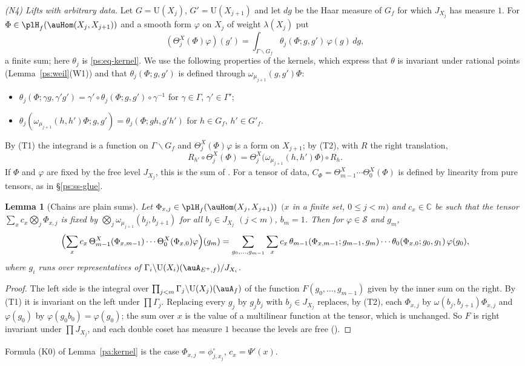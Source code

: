 \documentclass[10pt]{amsart}
\newtheorem{lemma}[theorem]{Lemma}
\theoremstyle{definition}
\theoremstyle{remark}
\newcommand{\C}{\mathbb C}
\providecommand{\auS}{\mathcal S}
\providecommand{\auU}{\mathrm U}
\begin{document}
\emph{{\rm(N4)} Lifts with arbitrary data.} Let $G=\auU(X_j)$, $G'=\auU(X_{j+1})$ and let $dg$ be
the Haar measure of $G_f$ for which $J_{X_j}$ has measure $1$. For $\Phi\in\plH_f(\auHom(X_j,
X_{j+1}))$ and a smooth form $\varphi$ on $X_j$ of weight $\lambda(X_j)$ put
\[
(\Theta^X_j(\Phi)\varphi)(g')=\int_{\Gamma\backslash G_f}\theta_j(\Phi;g,g')\,\varphi(g)\,dg ,
\]
a finite sum; here $\theta_j$ is \eqref{ps:eq-kernel}. We use the following properties of the
kernels, which express that $\theta$ is invariant under rational points (Lemma~\ref{ps:weil}(W1))
and that $\theta_j(\Phi;g,g')$ is defined through $\omega_{\mu_{j+1}}(g,g')\Phi$:
\begin{itemize}
\item[(T1)] $\theta_j(\Phi;\gamma g,\gamma'g')=\gamma'\circ\theta_j(\Phi;g,g')\circ\gamma^{-1}$ for
$\gamma\in\Gamma$, $\gamma'\in\Gamma'$;
\item[(T2)] $\theta_j(\omega_{\mu_{j+1}}(h,h')\Phi;g,g')=\theta_j(\Phi;gh,g'h')$ for $h\in G_f$,
$h'\in G'_f$.
\end{itemize}
By (T1) the integrand is a function on $\Gamma\backslash G_f$ and $\Theta^X_j(\Phi)\varphi$ is a
form on $X_{j+1}$; by (T2), with $R$ the right translation,
\begin{equation}\label{pl:eq-equiv}
R_{h'}\circ\Theta^X_j(\Phi)=\Theta^X_j\bigl(\omega_{\mu_{j+1}}(h,h')\Phi\bigr)\circ R_h .
\end{equation}
If $\Phi$ and $\varphi$ are fixed by the free level $J_{X_j}$, this is the sum of
{\cite[\S14.8]{P46}}. For a tensor of data, $C_\Phi=\Theta^X_{m-1}\cdots\Theta^X_0(\Phi)$ is defined
by linearity from pure tensors, as in \S\ref{ps:ss-glue}.

\begin{lemma}[Chains are plain sums]\label{pl:sum}
Let $\Phi_{x,j}\in\plH_f(\auHom(X_j,X_{j+1}))$ $(x$ in a finite set, $0\le j<m)$ and $c_x\in\C$ be
such that the tensor $\sum_xc_x\bigotimes_j\Phi_{x,j}$ is fixed by $\bigotimes_j\omega_{\mu_{j+1}}
(b_j,b_{j+1})$ for all $b_j\in J_{X_j}$ $(j<m)$, $b_m=1$. Then for $\varphi\in\auS$ and $g_m$,
\[
\Bigl(\sum_xc_x\,\Theta^X_{m-1}(\Phi_{x,m-1})\cdots\Theta^X_0(\Phi_{x,0})\varphi\Bigr)(g_m)=
\sum_{g_0,\dots,g_{m-1}}\sum_xc_x\,\theta_{m-1}(\Phi_{x,m-1};g_{m-1},g_m)\cdots\theta_0(\Phi_{x,0};
g_0,g_1)\,\varphi(g_0),
\]
where $g_i$ runs over representatives of $\Gamma_i\backslash\auU(X_i)(\auA_{E^+,f})/J_{X_i}$.
\end{lemma}
\begin{proof}
The left side is the integral over $\prod_{j<m}\Gamma_j\backslash\auU(X_j)(\auA_f)$ of the function
$F(g_0,\dots,g_{m-1})$ given by the inner sum on the right. By (T1) it is invariant on the left
under $\prod\Gamma_j$. Replacing every $g_j$ by $g_jb_j$ with $b_j\in J_{X_j}$ replaces, by (T2),
each $\Phi_{x,j}$ by $\omega(b_j,b_{j+1})\Phi_{x,j}$ and $\varphi(g_0)$ by $\varphi(g_0b_0)=
\varphi(g_0)$; the sum over $x$ is the value of a multilinear function at the tensor, which is
unchanged. So $F$ is right invariant under $\prod J_{X_j}$, and each double coset has measure
$1$ because the levels are free ({\cite[Lemma~14.5]{P46}}).
\end{proof}
Formula (K0) of Lemma~\ref{pa:kernel} is the case $\Phi_{x,j}=\phi^\circ_{j,x_j}$, $c_x=\Psi'(x)$.
\end{document}

